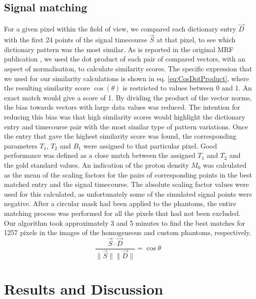 \documentclass[journal]{IEEEtran}
\newcommand{\norm}[1]{\lVert#1\rVert}
\begin{document}
\subsection{Signal matching} 
For a given pixel within the field of view, we compared each dictionary entry $\vec{D}$ with the first 24 points of the signal timecourse $\vec{S}$ at that pixel, to see which dictionary pattern was the most similar. 
As is reported in the original MRF publication \cite{ma2013magnetic}, we used the dot product of each pair of compared vectors, with an aspect of normalisation, to calculate similarity scores. The specific expression that we used for our similarity calculations is shown in eq. \ref{eq:CosDotProduct}, where the resulting similarity score $\cos(\theta)$ is restricted to values between 0 and 1. An exact match would give a score of 1. By dividing the product of the vector norms, the bias towards vectors with large data values was reduced. The intention for reducing this bias was that high similarity scores would highlight the dictionary entry and timecourse pair with the most similar type of pattern variations. Once the entry that gave the highest similarity score was found, the corresponding parameters $T_1$, $T_2$ and $B_1$ were assigned to that particular pixel. Good performance was defined as a close match between the assigned $T_1$ and $T_2$ and the gold standard values. An indication of the proton density $M_0$ was calculated as the mean of the scaling factors for the pairs of corresponding points in the best matched entry and the signal timecourse. The absolute scaling factor values were used for this calculated, as unfortunately some of the simulated signal points were negative. After a circular mask had been applied to the phantoms, the entire matching process was performed for all the pixels that had not been excluded. Our algorithm took approximately 3 and 5 minutes to find the best matches for 1257 pixels in the images of the homogeneous and custom phantoms, respectively.
\begin{equation} \label{eq:CosDotProduct}
\frac{\vec{S}\cdot \vec{D}} {\norm{\vec{S}} \norm{\vec{D}}} = \cos{\theta} 
\end{equation}

\section{Results and Discussion}
\end{document}
